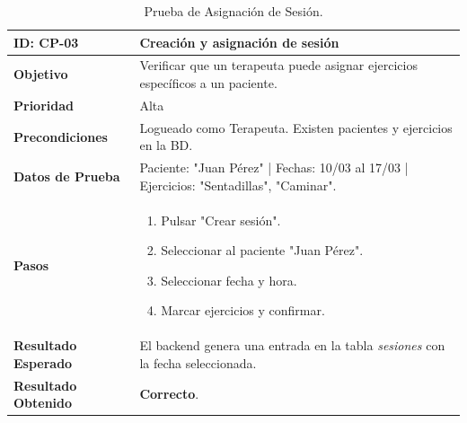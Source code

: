 \begin{table}[H]
    \centering
    \begin{tabularx}{\textwidth}{|l|X|}
        \hline
        \rowcolor{gray!25} \textbf{ID: CP-03} & \textbf{Creación y asignación de sesión} \\ \hline
        \textbf{Objetivo} & Verificar que un terapeuta puede asignar ejercicios específicos a un paciente. \\ \hline
        \textbf{Prioridad} & Alta \\ \hline
        \textbf{Precondiciones} & Logueado como Terapeuta. Existen pacientes y ejercicios en la BD. \\ \hline
        \textbf{Datos de Prueba} & Paciente: "Juan Pérez" | Fechas: 10/03 al 17/03 | Ejercicios: "Sentadillas", "Caminar". \\ \hline
        \textbf{Pasos} & 
        \vspace*{-\baselineskip}
        \begin{enumerate}
            \item Pulsar "Crear sesión".
            \item Seleccionar al paciente "Juan Pérez".
            \item Seleccionar fecha y hora.
            \item Marcar ejercicios y confirmar.
        \end{enumerate} \\ \hline
        \textbf{Resultado Esperado} & El backend genera una entrada en la tabla \textit{sesiones} con la fecha seleccionada. \\ \hline
        \textbf{Resultado Obtenido} & \textcolor{green!40!black}{\textbf{Correcto}}. \\ \hline
    \end{tabularx}
    \caption{Prueba de Asignación de Sesión.}
\end{table}

